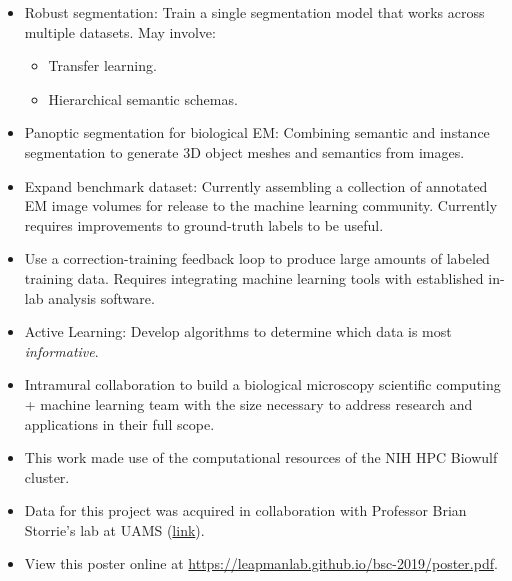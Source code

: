 \documentclass[final]{beamer}
\newlength{\onecolwid}
\renewcommand{\emph}[1]{{\color{nibib2} #1}}
\begin{document}
\begin{frame}[t]
\begin{columns}[t]
\begin{column}{\onecolwid}
    \begin{tcolorbox}[title=Future Work]
		\begin{itemize}
            \item \emph{Robust segmentation}: Train a single segmentation model that works across multiple datasets. May involve:
            \begin{itemize}
            \item Transfer learning.
            \item Hierarchical semantic schemas.
            \end{itemize}
            \item \emph{Panoptic segmentation} for biological EM: Combining semantic and instance segmentation to generate 3D object meshes and semantics from images.
            \item \emph{Expand benchmark dataset}: Currently assembling a collection of annotated EM image volumes for release to the machine learning community. Currently requires improvements to ground-truth labels to be useful.
            \item Use a \emph{correction-training feedback loop} to produce large amounts of labeled training data. Requires integrating machine learning tools with established in-lab analysis software.
            \item \emph{Active Learning:} Develop algorithms to determine which data is most \textit{informative}. 
            \item \emph{Intramural collaboration} to build a biological microscopy scientific computing + machine learning team with the size necessary to address research and applications in their full scope.
        \end{itemize}
    \end{tcolorbox}
    
    \begin{tcolorbox}[title=References]
        \nocite{GuayDesigning2018}
        \nocite{Guay2018problems}
        
        
        
    \end{tcolorbox}

    \begin{tcolorbox}[title=Acknowledgements]
        \begin{itemize}
            \item This work made use of the computational resources of the \emph{NIH HPC Biowulf cluster}.
            \item Data for this project was acquired in collaboration with Professor Brian Storrie's lab at UAMS (\href{https://physiology.uams.edu/faculty/brian-storrie/}{link}).            
            \item \emph{View this poster online} at \href{https://leapmanlab.github.io/bsc-2019/poster.pdf}{https://leapmanlab.github.io/bsc-2019/poster.pdf}.
        \end{itemize}
    \end{tcolorbox}
    

\end{column}
\end{columns}
\end{frame}
\end{document}
